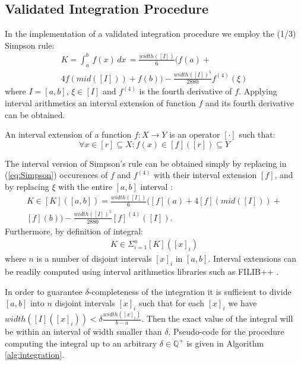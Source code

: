 \subsection{Validated Integration Procedure}
In the implementation of a validated integration procedure we employ the (1/3) Simpson rule:
\begin{equation}\label{eq:Simpson}
\begin{split}
K= \int_{a}^{b} \, f(x)\, dx\, = \frac{width([I])}{6}(f(a) + \\
4 f(mid([I])) + f(b)) - \frac{width([I])^5}{2880}f^{(4)}(\xi)
\end{split}
\end{equation}
where $I=[a,b]$, $\xi \in [I]$ and $f^{(4)}$ is the fourth derivative of $f$.
Applying interval arithmetics an interval extension of function $f$ and its fourth derivative 
can be obtained.
\begin{definition}
An interval extension of a function $f:X \rightarrow Y$ is an operator $[\cdot]$ such that:
\begin{equation*}
	\forall x \in [r] \subseteq X: f(x) \in [f]([r]) \subseteq Y
\end{equation*}
\end{definition} 

The interval version of Simpson's rule can be obtained simply by replacing in (\ref{eq:Simpson})
occurences of $f$ and $f^{(4)}$ with their interval extension $[f]$, and by replacing $\xi$ with
the entire $[a,b]$ interval \cite{ValidatedIntegration}:
\[
\begin{split}
K \in [K]([a, b]) = \frac{width([I])}{6}([f](a) + 4 [f](mid([I])) + \\
[f](b)) - \frac{width([I])^5}{2880}[f]^{(4)}([I]).
\end{split}
\]
Furthermore, by definition of integral:
\[
\begin{split}
K \in \Sigma_{i = 1}^{n} [K]([x]_{i})
\end{split}
\]
where $n$ is a number of disjoint intervals $[x]_{i}$ in $[a, b]$. Interval extensions can
be readily computed using interval arithmetics libraries such as FILIB++ \cite{filib}.

In order to guarantee $\delta$-completeness of the integration it is sufficient to divide 
$[a, b]$ into $n$ disjoint intervals $[x]_{i}$ such that for each $[x]_{i}$ we have
$width([I]([x]_{i})) < \delta \frac{width([x]_{i})}{b - a}$. Then the exact value of the 
integral will be within an interval of width smaller than $\delta$. Pseudo-code for the 
procedure computing the integral up to an arbitrary $\delta \in \mathbb{Q}^{+}$ is given 
in Algorithm \ref{alg:integration}.

